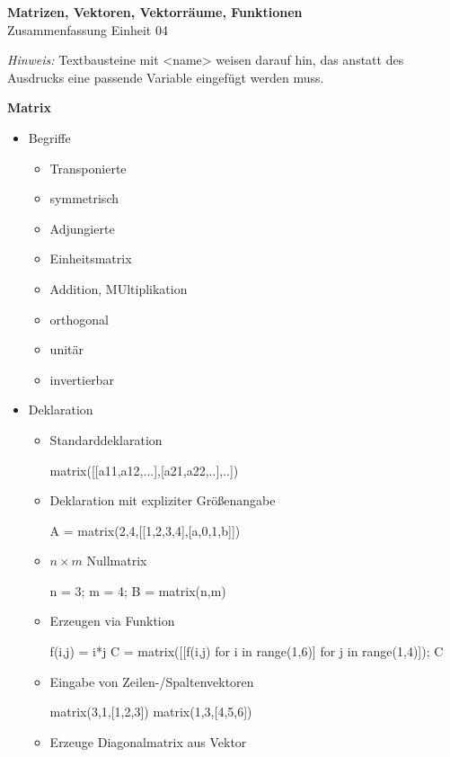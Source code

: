 \documentclass[a4paper,9pt,DIV15,twocolumn]{scrartcl}
\begin{document}
\begin{center}
    \textbf{\LARGE Matrizen, Vektoren, Vektorräume, Funktionen}\\
    {\large Zusammenfassung Einheit 04}
\end{center}
\textsl{Hinweis:} Textbausteine mit <name> weisen darauf hin, das anstatt des Ausdrucks eine passende Variable eingefügt werden muss.

\medskip
\textbf{Matrix}
\begin{itemize}
\item Begriffe
\begin{itemize}
 \item Transponierte
 \item symmetrisch
 \item Adjungierte
 \item Einheitsmatrix
 \item Addition, MUltiplikation
 \item orthogonal
 \item unitär
 \item invertierbar
\end{itemize}
\item Deklaration
\begin{itemize}
\item Standarddeklaration
\begin{sagein}
matrix([[a11,a12,...],[a21,a22,..],..])
\end{sagein}
\item Deklaration mit expliziter Größenangabe
\begin{sagein}
A = matrix(2,4,[[1,2,3,4],[a,0,1,b]]) 
\end{sagein}
\item $n\times m$ Nullmatrix
\begin{sagein}
n = 3; m = 4; B = matrix(n,m)
\end{sagein}
\item Erzeugen via Funktion
\begin{sagein}
f(i,j) = i*j
C = matrix([[f(i,j) for i in range(1,6)] for j in range(1,4)]); C
\end{sagein}
\item Eingabe von Zeilen-/Spaltenvektoren
\begin{sagein}
matrix(3,1,[1,2,3])
matrix(1,3,[4,5,6])
\end{sagein}
\item Erzeuge Diagonalmatrix aus Vektor
\begin{sagein}

\end{sagein}
\end{itemize}
\end{itemize}
\end{document}
